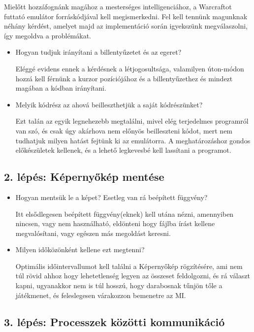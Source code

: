 Mielőtt hozzáfognánk magához a mesterséges intelligenciához, a Warcraftot futtató emulátor forráskódjával kell megismerkedni. Fel kell tennünk magunknak néhány kérdést, amelyet majd az implementáció során igyekszünk megválaszolni, így megoldva a problémákat.

\begin{itemize}
    \item Hogyan tudjuk irányítani a billentyűzetet és az egeret?
    
    Eléggé evidens ennek a kérdésnek a létjogosultsága, valamilyen úton-módon hozzá kell férnünk a kurzor pozíciójához és a billentyűzethez és mindezt magában a kódban irányítani.  
    \item Melyik kódrész az ahová beilleszthetjük a saját kódrészünket?
    
    Ezt talán az egyik legnehezebb megtalálni, mivel elég terjedelmes programról van szó, és csak úgy akárhova nem előnyös beilleszteni kódot, mert nem tudhatjuk milyen hatást fejtünk ki az emulátorra. A meghatározáshoz gondos előkészületek kellenek, és a lehető legkevesbé kell lassítani a programot.
\end{itemize}

\subsection{2. lépés: Képernyőkép mentése}

\begin{itemize}
    \item Hogyan mentsük le a képet? Esetleg van rá beépített függvény?
    
    Itt elsődlegesen beépített függvény(eknek) kell utána nézni, amennyiben nincsen, vagy nem használható, eldönteni hogy fájlba írást kellene megvalósítani, vagy egészen más megoldást keresni.
    \item Milyen időközönként kellene ezt megtenni?
    
    Optimális időintervallumot kell találni a Képernyőkép rögzítésére, ami nem túl rövid ahhoz hogy lehetetlenség legyen az összeset feldolgozni, és rá választ kapni, ugyanakkor nem is túl hosszú, hogy darabosnak tűnjön tőle a játékmenet, és feleslegesen várakozzon bemenetre az MI.
\end{itemize}

\subsection{3. lépés: Processzek közötti kommunikáció}

